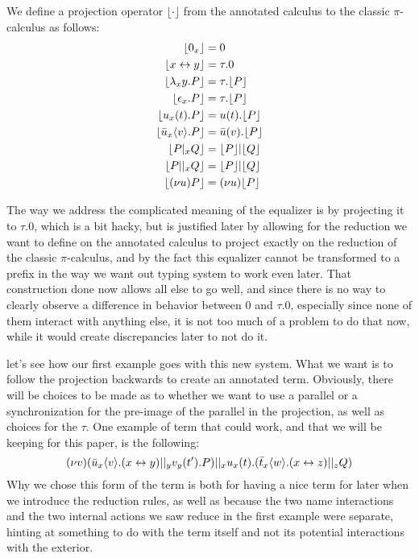 \begin{definition}
We define a projection operator $\lfloor\cdot\rfloor$ from the annotated calculus to the classic $\pi$-calculus as follows:\\
\begin{align*}
\lfloor 0_x \rfloor &= 0 \\
\lfloor x \leftrightarrow y \rfloor &= \tau.0 \\
\lfloor \lambda_xy.P \rfloor &= \tau.\lfloor P \rfloor \\
\lfloor \epsilon_x.P \rfloor &= \tau.\lfloor P \rfloor \\
\lfloor u_x(t).P \rfloor &= u(t).\lfloor P \rfloor \\
\lfloor \bar{u}_x\langle v\rangle.P \rfloor &= \bar{u}(v).\lfloor P \rfloor \\
\lfloor P |_x Q \rfloor &= \lfloor P \rfloor | \lfloor Q \rfloor \\
\lfloor P ||_x Q \rfloor &= \lfloor P \rfloor | \lfloor Q \rfloor \\
\lfloor (\nu u)P \rfloor &= (\nu u)\lfloor P \rfloor
\end{align*}
\end{definition}

\remark The way we address the complicated meaning of the equalizer is by projecting it to $\tau.0$, which is a bit hacky, but is justified later by allowing for the reduction we want to define on the annotated calculus to project exactly on the reduction of the classic $\pi$-calculus, and by the fact this equalizer cannot be transformed to a prefix in the way we want out typing system to work even later. That construction done now allows all else to go well, and since there is no way to clearly observe a difference in behavior between $0$ and $\tau.0$, especially since none of them interact with anything else, it is not too much of a problem to do that now, while it would create discrepancies later to not do it.

\example let's see how our first example goes with this new system. What we want is to follow the projection backwards to create an annotated term. Obviously, there will be choices to be made as to whether we want to use a parallel or a synchronization for the pre-image of the parallel in the projection, as well as choices for the $\tau$. One example of term that could work, and that we will be keeping for this paper, is the following:
\[(\nu v)(\bar{u}_x\langle v\rangle.(x\leftrightarrow y) ||_y v_y(t').P) ||_x u_x(t).(\bar{t}_x\langle w\rangle.(x\leftrightarrow z) ||_z Q)\]
Why we chose this form of the term is both for having a nice term for later when we introduce the reduction rules, as well as because the two name interactions and the two internal actions we saw reduce in the first example were separate, hinting at something to do with the term itself and not its potential interactions with the exterior.
